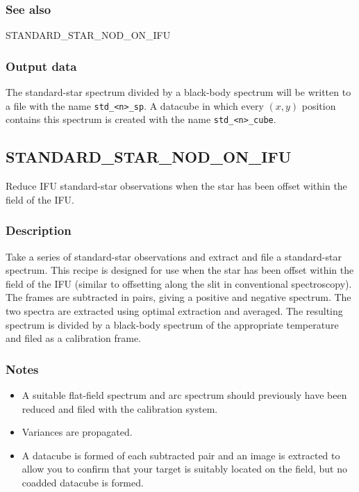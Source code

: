 \documentclass[twoside,11pt,nolof]{starlink}
\begin{document}
\subsubsection*{See also}

STANDARD\_STAR\_NOD\_ON\_IFU

\subsubsection*{Output data}

The standard-star spectrum divided by a black-body spectrum will be written to
a file with the name \texttt{std\_<n>\_sp}. A datacube in which every
$(x,y)$ position contains this spectrum is created with the name \texttt{std\_<n>\_cube}.

\clearpage



\subsection{STANDARD\_STAR\_NOD\_ON\_IFU}

Reduce IFU standard-star observations when the star
has been offset within the field of the IFU.

\subsubsection*{Description}

Take a series of standard-star observations and extract and file a
standard-star spectrum. This recipe is designed for use when the star
has been offset within the field of the IFU (similar to offsetting
along the slit in conventional spectroscopy). The frames are
subtracted in pairs, giving a positive and negative spectrum. The two
spectra are extracted using optimal extraction and averaged. The
resulting spectrum is divided by a black-body spectrum of the
appropriate temperature and filed as a calibration frame.

\subsubsection*{Notes}\begin{itemize}
\item

A suitable flat-field spectrum and arc spectrum should previously have
been reduced and filed with the calibration system.

\item

  Variances are propagated.

\item

A datacube is formed of each subtracted pair and an image is extracted
to allow you to confirm that your target is suitably located on the
field, but no coadded datacube is formed.

\end{itemize}
\end{document}
